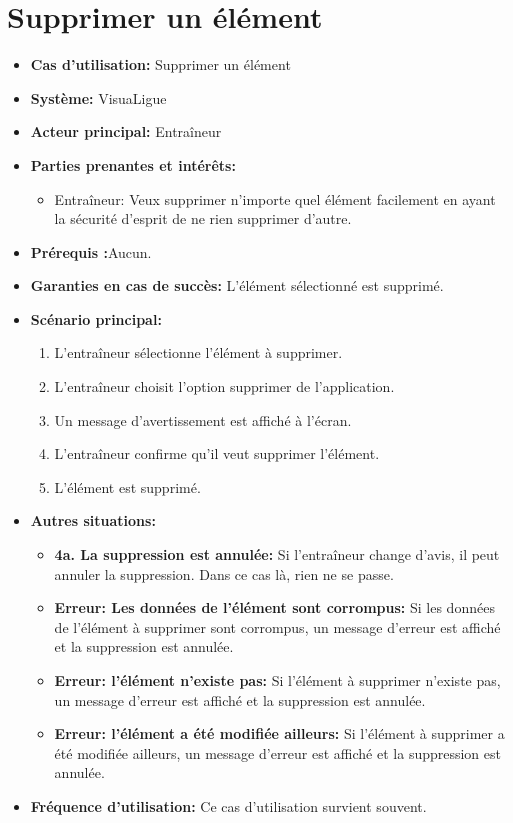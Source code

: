 \section{Supprimer un \'el\'ement}
\label{sec:supprimer_un_'el'ement}

\begin{itemize}
    \item \textbf{Cas d'utilisation:} Supprimer un \'el\'ement
    \item \textbf{Syst\`eme:} VisuaLigue
    \item \textbf{Acteur principal:} Entra\^ineur
    \item \textbf{Parties prenantes et int\'er\^ets:}
        \begin{itemize}
            \item Entraîneur: Veux supprimer n'importe quel élément facilement en ayant la sécurité d'esprit de ne rien supprimer d'autre.
        \end{itemize}
    \item \textbf{Pr\'erequis :}Aucun.
    \item \textbf{Garanties en cas de succ\`es:} L'élément sélectionné est supprimé.
    \item \textbf{Sc\'enario principal:}
        \begin{enumerate}
            \item L'entraîneur sélectionne l'élément à supprimer.
            \item L'entraîneur choisit l'option supprimer de l'application.
            \item Un message d'avertissement est affiché à l'écran.
            \item L'entraîneur confirme qu'il veut supprimer l'\'el\'ement.
            \item L'\'el\'ement est supprim\'e.
        \end{enumerate}
    \item \textbf{Autres situations:}
        \begin{itemize}
            \item \textbf{4a. La suppression est annul\'ee:} Si l'entraîneur change d'avis, il peut annuler la suppression. Dans ce cas l\`a, rien ne se passe.
            \item \textbf{Erreur: Les donn\'ees de l'\'el\'ement sont corrompus:} Si les donn\'ees de l'\'el\'ement \`a supprimer sont corrompus, un message d'erreur est affich\'e et la suppression est annul\'ee.
            \item \textbf{Erreur: l'\'el\'ement n'existe pas:} Si l'\'el\'ement \`a supprimer n'existe pas, un message d'erreur est affich\'e et la suppression est annul\'ee.
            \item \textbf{Erreur: l'\'el\'ement a \'et\'e modifi\'ee ailleurs:} Si l'\'el\'ement \`a supprimer a \'et\'e modifi\'ee ailleurs, un message d'erreur est affich\'e et la suppression est annul\'ee.
        \end{itemize}
    \item \textbf{Fréquence d'utilisation:} Ce cas d'utilisation survient souvent.
\end{itemize}



